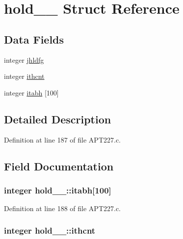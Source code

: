 \hypertarget{structhold__1__}{}\section{hold\+\_\+\_\+ Struct Reference}
\label{structhold__1__}
\subsection*{Data Fields}
\begin{DoxyCompactItemize}
\item 
integer \hyperlink{structhold__1___a2c760b53520efd9c5e0c3c23e8176c59}{jhldfg}
\item 
integer \hyperlink{structhold__1___a7646bd7bac76ead775ba5648f9990fd9}{ithcnt}
\item 
integer \hyperlink{structhold__1___a16870bf5e64669177c6755ff83556f75}{itabh} \mbox{[}100\mbox{]}
\end{DoxyCompactItemize}


\subsection{Detailed Description}


Definition at line 187 of file A\+P\+T227.\+c.



\subsection{Field Documentation}
\subsubsection[{\texorpdfstring{itabh}{itabh}}]{\setlength{\rightskip}{0pt plus 5cm}integer hold\+\_\+\_\+\+::itabh\mbox{[}100\mbox{]}}\hypertarget{structhold__1___a16870bf5e64669177c6755ff83556f75}{}\label{structhold__1___a16870bf5e64669177c6755ff83556f75}


Definition at line 188 of file A\+P\+T227.\+c.

\subsubsection[{\texorpdfstring{ithcnt}{ithcnt}}]{\setlength{\rightskip}{0pt plus 5cm}integer hold\+\_\+\_\+\+::ithcnt}\hypertarget{structhold__1___a7646bd7bac76ead775ba5648f9990fd9}{}\label{structhold__1___a7646bd7bac76ead775ba5648f9990fd9}


